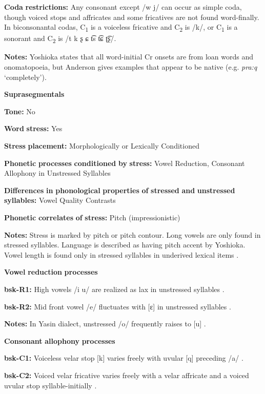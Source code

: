 \textbf{Coda} \textbf{restrictions:} Any consonant except /w j/ can occur as simple coda, though voiced stops and affricates and some fricatives are not found word-finally. In biconsonantal codas, C\textsubscript{1} is a voiceless fricative and C\textsubscript{2} is /k/, or C\textsubscript{1} is a sonorant and C\textsubscript{2} is /t k ʂ ɕ t͡s t͡ɕ ʈ͡ʂ/. 

\textbf{Notes:} Yoshioka states that all word-initial Cr onsets are from loan words and onomatopoeia, but Anderson gives examples that appear to be native (e.g. \textit{pra:q} ‘completely’).

\textbf{Suprasegmentals}

\textbf{Tone:} No

\textbf{Word} \textbf{stress:} Yes

\textbf{Stress} \textbf{placement:} Morphologically or Lexically Conditioned

\textbf{Phonetic} \textbf{processes} \textbf{conditioned} \textbf{by} \textbf{stress:} Vowel Reduction, Consonant Allophony in Unstressed Syllables

\textbf{Differences} \textbf{in} \textbf{phonological} \textbf{properties} \textbf{of} \textbf{stressed} \textbf{and} \textbf{unstressed} \textbf{syllables:} Vowel Quality Contrasts

\textbf{Phonetic} \textbf{correlates} \textbf{of} \textbf{stress:} Pitch (impressionistic)

\textbf{Notes:} Stress is marked by pitch or pitch contour. Long vowels are only found in stressed syllables. Language is described as having pitch accent by Yoshioka. Vowel length is found only in stressed syllables in underived lexical items \citep[1028]{Anderson1997}.

\textbf{Vowel} \textbf{reduction} \textbf{processes}

\textbf{bsk-R1:} High vowels /i u/ are realized as lax in unstressed syllables \citep[1029]{Anderson1997}.

\textbf{bsk-R2:} Mid front vowel /e/ fluctuates with [ɛ] in unstressed syllables \citep[1029]{Anderson1997}.

\textbf{Notes:} In Yasin dialect, unstressed /o/ frequently raises to [u] \citep[1038]{Anderson1997}.

\textbf{Consonant} \textbf{allophony} \textbf{processes}

\textbf{bsk-C1:} Voiceless velar stop [k] varies freely with uvular [q] preceding /a/ \citep[1025]{Anderson1997}.

\textbf{bsk-C2:} Voiced velar fricative varies freely with a velar affricate and a voiced uvular stop syllable-initially \citep[1025]{Anderson1997}.

